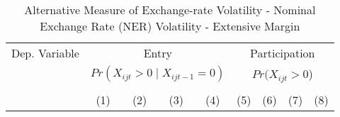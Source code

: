 \documentclass[11pt,twoside, authoryear]{elsarticle}
\begin{document}
\begin{landscape}
\begin{table}[htbp]\centering
 \begin{threeparttable}
\def\sym#1{\ifmmode^{#1}\else\(^{#1}\)\fi}
\caption{\label{NER_ext}Alternative Measure of Exchange-rate Volatility - Nominal Exchange Rate (NER) Volatility - Extensive Margin}
\begin{tabular}{l*{8}{c}}
\hline\hline
               Dep. Variable &\multicolumn{4}{c}{Entry}&\multicolumn{4}{c}{Participation}\\
                                &\multicolumn{4}{c}{$Pr(X_{ijt}>0\mid X_{ijt-1}=0)$}&\multicolumn{4}{c}{$Pr(X_{ijt}>0$)}\\
                 \cmidrule(lr){2-5}
  \cmidrule(lr){6-9} \\
                    &\multicolumn{1}{c}{(1)}&\multicolumn{1}{c}{(2)}&\multicolumn{1}{c}{(3)}&\multicolumn{1}{c}{(4)}&\multicolumn{1}{c}{(5)}&\multicolumn{1}{c}{(6)}&\multicolumn{1}{c}{(7)}&\multicolumn{1}{c}{(8)}\\

\hline


\end{tabular}
\end{threeparttable}
\end{table}
\end{landscape}
\end{document}
